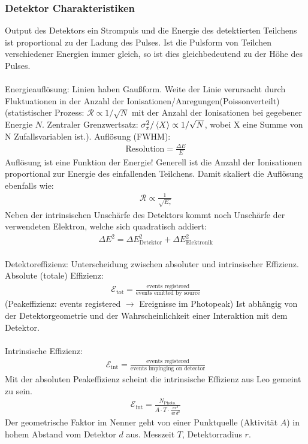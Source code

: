 \documentclass[11pt, a4paper]{article}
\numberwithin{equation}{section}
\begin{document}
\subsubsection{Detektor Charakteristiken}
Output des Detektors ein Strompuls und die Energie des detektierten Teilchens ist proportional zu der Ladung des Pulses.
Ist die Pulsform von Teilchen verschiedener Energien immer gleich, so ist dies gleichbedeutend zu der Höhe des Pulses.\\
\\
Energieauflösung: Linien haben Gaußform. Weite der Linie verursacht durch Fluktuationen in der Anzahl der Ionisationen/Anregungen(Poissonverteilt) (statistischer Prozess: $\mathcal{R} \propto 1 / \sqrt{N}$ mit der Anzahl der Ionisationen bei gegebener Energie $N$. Zentraler Grenzwertsatz: $\sigma_x^2 / \braket{X} \propto 1 / \sqrt{N}$, wobei X eine Summe von N Zufallsvariablen ist.).
Auflösung (FWHM):
\begin{align}
	\text{Resolution} = \frac{\Delta E}{E}
\end{align}
Auflösung ist eine Funktion der Energie! Generell ist die Anzahl der Ionisationen proportional zur Energie des einfallenden Teilchens. Damit skaliert die Auflösung ebenfalls wie:
\begin{align}
	\mathcal{R} \propto \frac{1}{\sqrt{E_\gamma}}
\end{align}
Neben der intrinsischen Unschärfe des Detektors kommt noch Unschärfe der verwendeten Elektron, welche sich quadratisch addiert:
\begin{align}
	\Delta E^2 = \Delta E_\mathrm{Detektor}^2 + \Delta E_\mathrm{Elektronik}^2
\end{align}
\\
Detektoreffizienz: Unterscheidung zwischen absoluter und intrinsischer Effizienz.\\
Absolute (totale) Effizienz:
\begin{align}
	\mathcal{E}_\mathrm{tot} = \frac{\text{events registered}}{\text{events emitted by source}}
\end{align}
(Peakeffizienz: events registered $\rightarrow$ Ereignisse im Photopeak) 
Ist abhängig von der Detektorgeometrie und der Wahrscheinlichkeit einer Interaktion mit dem Detektor.\\
\\
Intrinsische Effizienz:
\begin{align}
	\mathcal{E}_\mathrm{int} = \frac{\text{events registered}}{\text{events impinging on detector}}
\end{align}
Mit der absoluten Peakeffizienz scheint die intrinsische Effizienz aus Leo gemeint zu sein.
\begin{align}
	\mathcal{E}_\mathrm{int} = \frac{N_\mathrm{Photo.}}{A \cdot T \cdot \frac{\pi r^2}{4\pi \, d^2}}
\end{align}
Der geometrische Faktor im Nenner geht von einer Punktquelle (Aktivität $A$) in hohem Abstand vom Detektor $d$ aus. Messzeit $T$, Detektorradius $r$.
\end{document}
